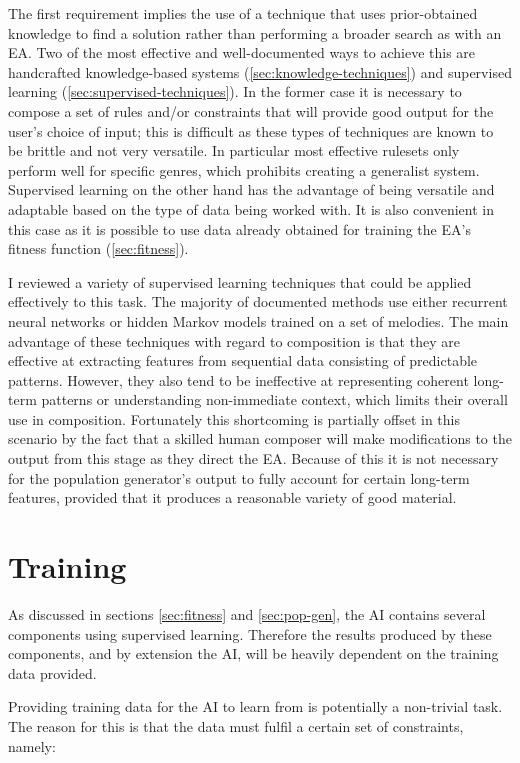 \documentclass[ author={Stephen Livermore-Tozer},
				supervisor={Dr. Peter Flach},
				degree={MEng},
				title={Performing Algorithmic Co-composition Using Machine Learning},
				subtitle={},
				type={research},
				year={2016} ]{dissertation}
\begin{document}
	The first requirement implies the use of a technique that uses prior-obtained knowledge to find a solution rather than performing a broader search as with an EA. Two of the most effective and well-documented ways to achieve this are handcrafted knowledge-based systems (\ref{sec:knowledge-techniques}) and supervised learning (\ref{sec:supervised-techniques}). In the former case it is necessary to compose a set of rules and/or constraints that will provide good output for the user's choice of input; this is difficult as these types of techniques are known to be brittle and not very versatile.	In particular most effective rulesets only perform well for specific genres, which prohibits creating a generalist system. Supervised learning on the other hand has the advantage of being versatile and adaptable based on the type of data being worked with. It is also convenient in this case as it is possible to use data already obtained for training the EA's fitness function (\ref{sec:fitness}).
	
	I reviewed a variety of supervised learning techniques that could be applied effectively to this task. The majority of documented methods use either recurrent neural networks or hidden Markov models trained on a set of melodies. The main advantage of these techniques with regard to composition is that they are effective at extracting features from sequential data consisting of predictable patterns. However, they also tend to be ineffective at representing coherent long-term patterns or understanding non-immediate context, which limits their overall use in composition. Fortunately this shortcoming is partially offset in this scenario by the fact that a skilled human composer will make modifications to the output from this stage as they direct the EA. Because of this it is not necessary for the population generator's output to fully account for certain long-term features, provided that it produces a reasonable variety of good material.
	
	\section{Training}
	
	As discussed in sections \ref{sec:fitness} and \ref{sec:pop-gen}, the AI contains several components using supervised learning. Therefore the results produced by these components, and by extension the AI, will be heavily dependent on the training data provided.
	
	Providing training data for the AI to learn from is potentially a non-trivial task. The reason for this is that the data must fulfil a certain set of constraints, namely:
	
\end{document}
